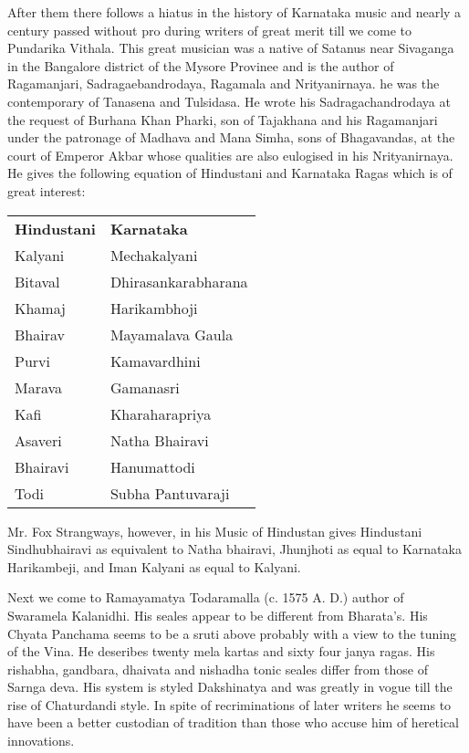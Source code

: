 \documentclass{book}
\begin{document}
After them there follows a hiatus in the history of Karnataka music
and nearly a century passed without pro during writers of great merit
till we come to Pundarika Vithala. This great musician was a native of
Satanus near Sivaganga in the Bangalore district of the Mysore
Provinee and is the author of Ragamanjari, Sadragaebandrodaya,
Ragamala and Nrityanirnaya. he was the contemporary of Tanasena and
Tulsidasa. He wrote his Sadragachandrodaya at the request of Burhana
Khan Pharki, son of Tajakhana and his Ragamanjari under the patronage
of Madhava and Mana Simha, sons of Bhagavandas, at the court of
Emperor Akbar whose qualities are also eulogised in his
Nrityanirnaya. He gives the following equation of Hindustani and
Karnataka Ragas which is of great interest:
\begin{center}
\begin{tabular}{ll}
\textbf{Hindustani}  & \textbf{Karnataka}\\
Kalyani & Mechakalyani\\
Bitaval & Dhirasankarabharana\\
Khamaj & Harikambhoji\\
Bhairav & Mayamalava Gaula\\
Purvi & Kamavardhini\\
Marava & Gamanasri\\
Kafi & Kharaharapriya\\
Asaveri & Natha Bhairavi\\
Bhairavi & Hanumattodi\\
Todi & Subha Pantuvaraji\\
\end{tabular}
\end{center}

Mr. Fox Strangways, however, in his Music of Hindustan gives
Hindustani Sindhubhairavi as equivalent to Natha bhairavi, Jhunjhoti
as equal to Karnataka Harikambeji, and Iman Kalyani as equal to
Kalyani.

Next we come to Ramayamatya Todaramalla (c. 1575 A. D.) author of
Swaramela Kalanidhi. His seales appear to be different from
Bharata's. His Chyata Panchama seems to be a sruti above probably with
a view to the tuning of the Vina. He deseribes twenty mela kartas and
sixty four janya ragas. His rishabha, gandbara, dhaivata and nishadha
tonic seales differ from those of Sarnga deva. His system is styled
Dakshinatya and was greatly in vogue till the rise of Chaturdandi
style. In spite of recriminations of later writers he seems to have
been a better custodian of tradition than those who accuse him of
heretical innovations.
\end{document}
